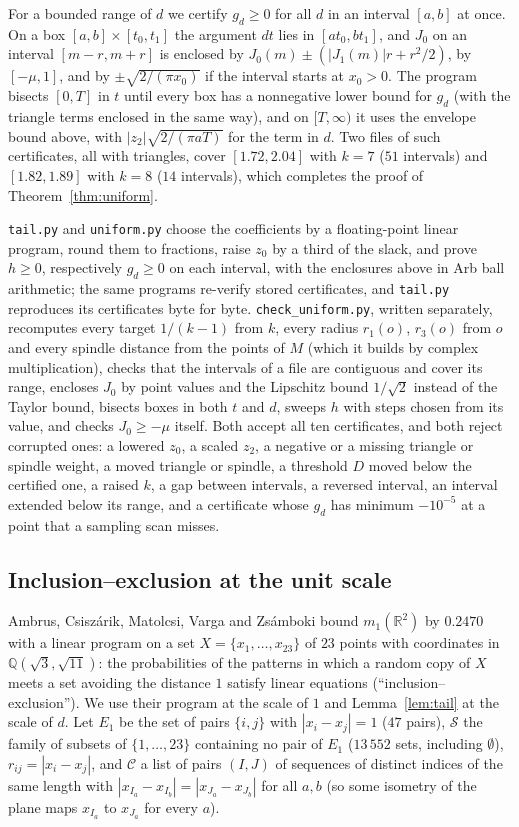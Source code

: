 \documentclass[11pt,a4paper]{amsart}
\theoremstyle{definition}
\theoremstyle{remark}
\newcommand{\Q}{\mathbb{Q}}
\newcommand{\R}{\mathbb{R}}
\begin{document}
For a bounded range of $d$ we certify $g_d\ge0$ for all $d$ in an interval $[a,b]$ at once. On a box
$[a,b]\times[t_0,t_1]$ the argument $dt$ lies in $[at_0,bt_1]$, and $J_0$ on an interval $[m-r,m+r]$ is enclosed by
$J_0(m)\pm(|J_1(m)|r+r^2/2)$, by $[-\mu,1]$, and by $\pm\sqrt{2/(\pi x_0)}$ if the interval starts at $x_0>0$. The
program bisects $[0,T]$ in $t$ until every box has a nonnegative lower bound for $g_d$ (with the triangle terms
enclosed in the same way), and on $[T,\infty)$ it uses the envelope bound above, with $|z_2|\sqrt{2/(\pi aT)}$ for the
term in $d$. Two files of such certificates, all with triangles, cover $[1.72,2.04]$ with $k=7$ ($51$ intervals)
and $[1.82,1.89]$ with $k=8$ ($14$ intervals), which completes the proof of Theorem~\ref{thm:uniform}.

\texttt{tail.py} and \texttt{uniform.py} choose the coefficients by a floating-point linear program, round them to
fractions, raise $z_0$ by a third of the slack, and prove $h\ge0$, respectively $g_d\ge0$ on each interval, with the
enclosures above in Arb ball arithmetic; the same programs re-verify stored certificates, and \texttt{tail.py}
reproduces its certificates byte for byte. \texttt{check\_uniform.py}, written separately, recomputes every target
$1/(k-1)$ from $k$, every radius $r_1(o)$, $r_3(o)$ from $o$ and every spindle distance from the points of $M$ (which
it builds by complex multiplication), checks that the intervals of a file are contiguous
and cover its range, encloses $J_0$ by point values and the Lipschitz bound $1/\sqrt2$ instead of the Taylor bound,
bisects boxes in both $t$ and $d$, sweeps $h$ with steps chosen from its value, and checks $J_0\ge-\mu$ itself. Both
accept all ten certificates, and both reject corrupted ones: a lowered $z_0$, a scaled $z_2$, a negative or a
missing triangle or spindle weight, a moved triangle or spindle, a threshold $D$ moved below the certified one, a
raised $k$, a gap
between intervals, a reversed interval, an interval extended below its range, and a certificate whose $g_d$ has
minimum $-10^{-5}$ at a point that a sampling scan misses.

\subsection*{Inclusion--exclusion at the unit scale}
Ambrus, Csiszárik, Matolcsi, Varga and Zsámboki \cite{ACMVZ} bound $m_1(\R^2)$ by $0.2470$ with a linear program on
a set $X=\{x_1,\dots,x_{23}\}$ of $23$ points with coordinates in $\Q(\sqrt3,\sqrt{11})$: the probabilities of the
patterns in which a random copy of $X$ meets a set avoiding the distance $1$ satisfy linear equations
(``inclusion--exclusion''). We use their program at the scale of $1$ and Lemma~\ref{lem:tail} at the scale of $d$.
Let $E_1$ be the set of pairs $\{i,j\}$ with $|x_i-x_j|=1$ ($47$ pairs), $\mathcal S$ the family of subsets of
$\{1,\dots,23\}$ containing no pair of $E_1$ ($13\,552$ sets, including $\emptyset$), $r_{ij}=|x_i-x_j|$, and
$\mathcal C$ a list of pairs $(I,J)$ of sequences of distinct indices of the same length with $|x_{I_a}-x_{I_b}|=
|x_{J_a}-x_{J_b}|$ for all $a,b$ (so some isometry of the plane maps $x_{I_a}$ to $x_{J_a}$ for every $a$).
\end{document}
